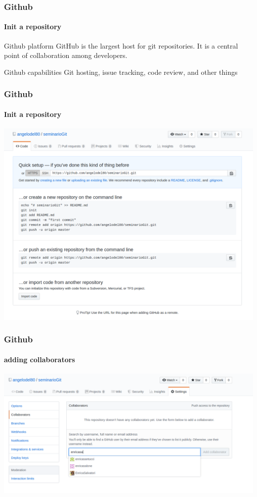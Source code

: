 \begin{frame}
	\frametitle{Github}
	\framesubtitle{Init a repository}
	\addtocounter{nframe}{1}
	
		\begin{block}{Github platform}
		GitHub is the largest host for git repositories. It is a central point of collaboration among developers.
 		\end{block}

		 \begin{block}{Github capabilities}
			Git hosting, issue tracking, code review, and other things
		\end{block}
	
\end{frame}
	
\begin{frame}
\frametitle{Github}
\framesubtitle{Init a repository}
\addtocounter{nframe}{1}

	\begin{center}
		\includegraphics[width=.9\textwidth]{imgs/GitHub-RepoInit.png}
	\end{center}

\end{frame}

\begin{frame}
	\frametitle{Github}
	\framesubtitle{adding collaborators}
	\addtocounter{nframe}{1}
	
	
		\begin{center}
			\includegraphics[width=.95\textwidth]{imgs/github-Collaborators.png}
		\end{center}
	
\end{frame}

